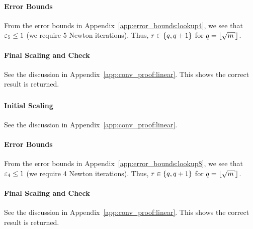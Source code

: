 \paragraph{Error Bounds}
From the error bounds in Appendix~\ref{app:error_bounds:lookup4},
we see that $\varepsilon_{5}\le1$ (we require 5 Newton iterations).
Thus, $r\in\left\{ q,q+1 \right\}$ for $q = \floor{\sqrt{m}}$.

\paragraph{Final Scaling and Check}
See the discussion in Appendix~\ref{app:conv_proof:linear}.
This shows the correct result is returned.

\subsubsection{\LookupEight{}}

\paragraph{Initial Scaling}
See the discussion in Appendix~\ref{app:conv_proof:linear}.

\paragraph{Error Bounds}
From the error bounds in Appendix~\ref{app:error_bounds:lookup8},
we see that $\varepsilon_{4}\le1$ (we require 4 Newton iterations).
Thus, $r\in\left\{ q,q+1 \right\}$ for $q = \floor{\sqrt{m}}$.

\paragraph{Final Scaling and Check}
See the discussion in Appendix~\ref{app:conv_proof:linear}.
This shows the correct result is returned.
